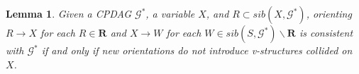 \documentclass{article}
\newtheorem{lemma}[theorem]{Lemma}
\begin{document}
\begin{lemma} \citep[Lemma 3.1]{maathuis2009estimating}
\label{lem: maathuis2009estimating}
    Given a CPDAG $\mathcal{G^*}$, a variable $X$, and $R \subset{sib(X, \mathcal{G^*})}$, orienting $R \rightarrow X$ for each $R \in \mathbf{R}$ and $X \rightarrow W$ for each $W \in sib(S,\mathcal{G^*}) \backslash \mathbf{R}$ is consistent with $\mathcal{G^*}$ if and only if new orientations do not introduce v-structures collided on $X$.
\end{lemma}%



\end{document}
